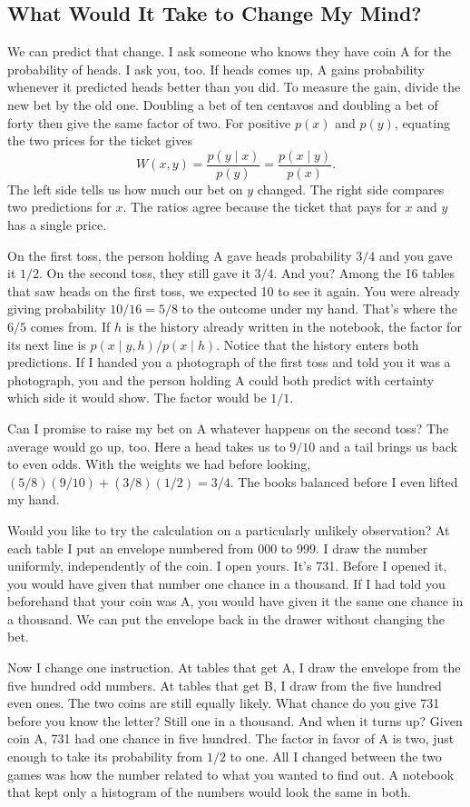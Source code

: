\documentclass[12pt,oneside]{article}
\newcommand{\secao}[1]{\Needspace{5.2\baselineskip}\subsection*{#1}}
\begin{document}
\secao{What Would It Take to Change My Mind?}
We can predict that change. I ask someone who knows they have coin A for the probability of heads. I ask you, too. If heads comes up, A gains probability whenever it predicted heads better than you did. To measure the gain, divide the new bet by the old one. Doubling a bet of ten centavos and doubling a bet of forty then give the same factor of two. For positive $p(x)$ and $p(y)$, equating the two prices for the ticket gives
\[
 W(x,y)=\frac{p(y\mid x)}{p(y)}
       =\frac{p(x\mid y)}{p(x)}.
\]
The left side tells us how much our bet on $y$ changed. The right side compares two predictions for $x$. The ratios agree because the ticket that pays for $x$ and $y$ has a single price.

On the first toss, the person holding A gave heads probability $3/4$ and you gave it $1/2$. On the second toss, they still gave it $3/4$. And you? Among the 16 tables that saw heads on the first toss, we expected 10 to see it again. You were already giving probability $10/16=5/8$ to the outcome under my hand. That's where the $6/5$ comes from. If $h$ is the history already written in the notebook, the factor for its next line is $p(x\mid y,h)/p(x\mid h)$. Notice that the history enters both predictions. If I handed you a photograph of the first toss and told you it was a photograph, you and the person holding A could both predict with certainty which side it would show. The factor would be $1/1$.

Can I promise to raise my bet on A whatever happens on the second toss? The average would go up, too. Here a head takes us to $9/10$ and a tail brings us back to even odds. With the weights we had before looking, $(5/8)(9/10)+(3/8)(1/2)=3/4$. The books balanced before I even lifted my hand.

Would you like to try the calculation on a particularly unlikely observation? At each table I put an envelope numbered from 000 to 999. I draw the number uniformly, independently of the coin. I open yours. It's 731. Before I opened it, you would have given that number one chance in a thousand. If I had told you beforehand that your coin was A, you would have given it the same one chance in a thousand. We can put the envelope back in the drawer without changing the bet.

Now I change one instruction. At tables that get A, I draw the envelope from the five hundred odd numbers. At tables that get B, I draw from the five hundred even ones. The two coins are still equally likely. What chance do you give 731 before you know the letter? Still one in a thousand. And when it turns up? Given coin A, 731 had one chance in five hundred. The factor in favor of A is two, just enough to take its probability from $1/2$ to one. All I changed between the two games was how the number related to what you wanted to find out. A notebook that kept only a histogram of the numbers would look the same in both.
\end{document}
